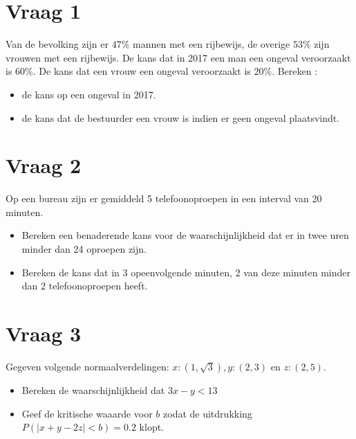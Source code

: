 \documentclass{article}
\begin{document}
 \section{Vraag 1}
  Van de bevolking zijn er $47\%$ mannen met een rijbewijs, de overige $53\%$ zijn vrouwen met een rijbewijs. De kans dat in 2017 een man een ongeval veroorzaakt is $60\%$. De kans dat een vrouw een ongeval veroorzaakt is $20\%$. Bereken :
 \begin{itemize}
    \item de kans op een ongeval in 2017.
    \item de kans dat de bestuurder een vrouw is indien er geen ongeval plaatsvindt.
 \end{itemize}

 \section{Vraag 2}
 Op een bureau zijn er gemiddeld 5 telefoonoproepen in een interval van 20 minuten.
 \begin{itemize}
  \item Bereken een benaderende kans voor de waarschijnlijkheid dat er in twee uren minder dan 24 oproepen zijn.
  \item Bereken de kans dat in 3 opeenvolgende minuten, 2 van deze minuten minder dan 2 telefoonoproepen heeft.
 \end{itemize}
 
 \section{Vraag 3}
 Gegeven volgende normaalverdelingen: $x:(1,\sqrt{3}), y:(2, 3)$ en $z:(2, 5)$.
 \begin{itemize}
  \item Bereken de waarschijnlijkheid dat $3x - y < 13$
  \item Geef de kritische waaarde voor $b$ zodat de uitdrukking $P(|x + y - 2z| < b) = 0.2$ klopt.
 \end{itemize}
\end{document}
